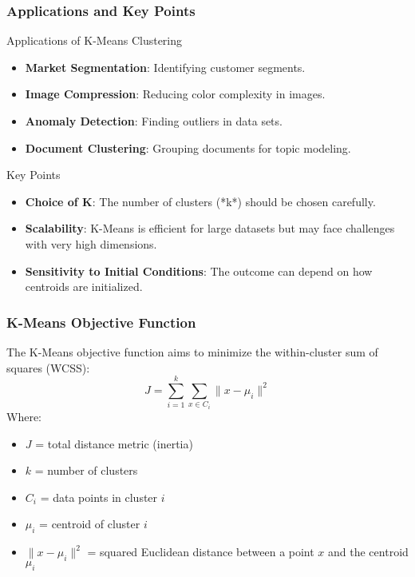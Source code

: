 \documentclass[aspectratio=169]{beamer}
\begin{document}
\begin{frame}[fragile]
    \frametitle{Applications and Key Points}
    \begin{block}{Applications of K-Means Clustering}
        \begin{itemize}
            \item \textbf{Market Segmentation}: Identifying customer segments.
            \item \textbf{Image Compression}: Reducing color complexity in images.
            \item \textbf{Anomaly Detection}: Finding outliers in data sets.
            \item \textbf{Document Clustering}: Grouping documents for topic modeling.
        \end{itemize}
    \end{block}

    \begin{block}{Key Points}
        \begin{itemize}
            \item \textbf{Choice of K}: The number of clusters (*k*) should be chosen carefully.
            \item \textbf{Scalability}: K-Means is efficient for large datasets but may face challenges with very high dimensions.
            \item \textbf{Sensitivity to Initial Conditions}: The outcome can depend on how centroids are initialized.
        \end{itemize}
    \end{block}
\end{frame}

\begin{frame}[fragile]
    \frametitle{K-Means Objective Function}
    The K-Means objective function aims to minimize the within-cluster sum of squares (WCSS):
    \begin{equation}
        J = \sum_{i=1}^k \sum_{x \in C_i} \| x - \mu_i \|^2
    \end{equation}
    Where:
    \begin{itemize}
        \item \( J \) = total distance metric (inertia)
        \item \( k \) = number of clusters
        \item \( C_i \) = data points in cluster \( i \)
        \item \( \mu_i \) = centroid of cluster \( i \)
        \item \( \| x - \mu_i \|^2 \) = squared Euclidean distance between a point \( x \) and the centroid \( \mu_i \)
    \end{itemize}
\end{frame}
\end{document}
